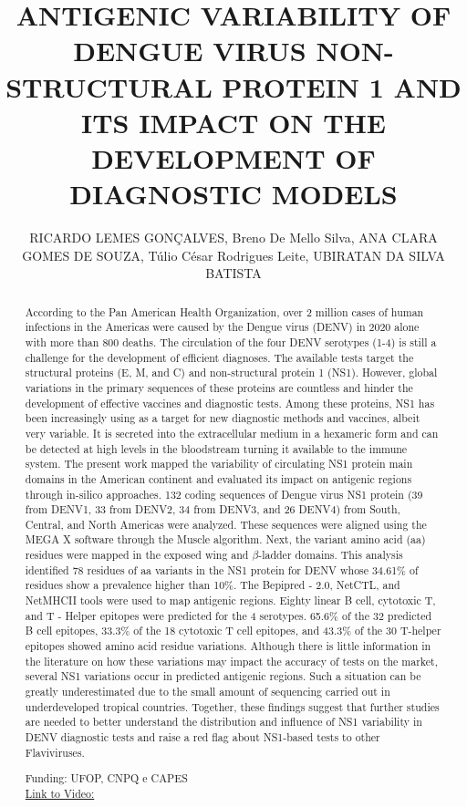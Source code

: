 \documentclass[twoside]{article}
\title{\vspace{-15mm}\fontsize{24pt}{10pt}\selectfont\textbf{ ANTIGENIC VARIABILITY OF DENGUE VIRUS NON-STRUCTURAL PROTEIN 1 AND ITS IMPACT ON THE DEVELOPMENT OF DIAGNOSTIC MODELS }} %
\author{ RICARDO LEMES GON\c{C}ALVES,  Breno De Mello Silva,  ANA CLARA GOMES DE SOUZA,  T\'ulio C\'esar Rodrigues Leite,  UBIRATAN DA SILVA BATISTA }
\affil{ UNIVERSIDADE FEDERAL DE OURO PRETO,  UFOP - UNIVERSIDADE FEDERAL  DE OURO PRETO }
\date{}
\begin{document}
  
  
  \maketitle %
  
  
  \thispagestyle{fancy} %
  
  
  \begin{abstract}
  According to the Pan American Health Organization,  over 2 million cases of human infections in the Americas were caused by the Dengue virus (DENV) in 2020 alone with more than 800 deaths. The circulation of the four DENV serotypes (1-4) is still a challenge for the development of efficient diagnoses. The available tests target the structural proteins (E,  M,  and C) and non-structural protein 1 (NS1). However,  global variations in the primary sequences of these proteins are countless and hinder the development of effective vaccines and diagnostic tests. Among these proteins,  NS1 has been increasingly using as a target for new diagnostic methods and vaccines,  albeit very variable. It is secreted into the extracellular medium in a hexameric form and can be detected at high levels in the bloodstream turning it available to the immune system. The present work mapped the variability of circulating NS1 protein main domains in the American continent and evaluated its impact on antigenic regions through in-silico approaches. 132 coding sequences of Dengue virus NS1 protein (39 from DENV1,  33 from DENV2,  34 from DENV3,  and 26 DENV4) from South,  Central,  and North Americas were analyzed. These sequences were aligned using the MEGA X software through the Muscle algorithm. Next,  the variant amino acid (aa) residues were mapped in the exposed wing and $\beta$-ladder domains. This analysis identified 78 residues of aa variants in the NS1 protein for DENV whose 34.61\% of residues show a prevalence higher than 10\%. The Bepipred - 2.0,  NetCTL,  and NetMHCII tools were used to map antigenic regions. Eighty linear B cell,  cytotoxic T,  and T - Helper epitopes were predicted for the 4 serotypes. 65.6\% of the 32 predicted B cell epitopes,  33.3\% of the 18 cytotoxic T cell epitopes,  and 43.3\% of the 30 T-helper epitopes showed amino acid residue variations. Although there is little information in the literature on how these variations may impact the accuracy of tests on the market,  several NS1 variations occur in predicted antigenic regions. Such a situation can be greatly underestimated due to the small amount of sequencing carried out in underdeveloped tropical countries. Together,  these findings suggest that further studies are needed to better understand the distribution and influence of NS1 variability in DENV diagnostic tests and raise a red flag about NS1-based tests to other Flaviviruses.
  
  Funding: UFOP,  CNPQ e CAPES \\
  \href{http://ab3c.org.br/xpress_pres2020/xmxp2020-301377.html}{Link to Video:}

  \end{abstract}
   
  
\end{document}
